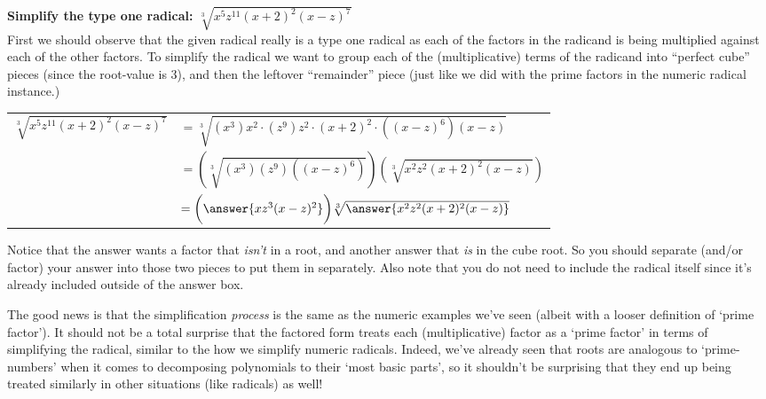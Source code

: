 \documentclass{ximera}
\begin{document}
    \begin{problem}
    {\bfseries Simplify the type one radical: $\sqrt[3]{x^5z^{11}(x+2)^2(x-z)^7}$}\\%
    
        First we should observe that the given radical really is a type one radical as each of the factors in the radicand is being multiplied against each of the other factors. To simplify the radical we want to group each of the (multiplicative) terms of the radicand into ``perfect cube'' pieces (since the root-value is $3$), and then the leftover ``remainder'' piece (just like we did with the prime factors in the numeric radical instance.)
        
        \begin{tabular}{rl}
            $\sqrt[3]{x^5z^{11}(x+2)^2(x-z)^7}$ &   $= \sqrt[3]{(x^3) x^2 \cdot (z^9) z^2 \cdot (x+2)^2 \cdot ((x-z)^6) (x-z)}$                 \\
                                                &   $= \left(\sqrt[3]{(x^3)(z^9)((x-z)^6)}\right) \left(\sqrt[3]{x^2 z^2 (x+2)^2 (x-z)}\right)$  \\
                                                &   $= \bigg(\answer{x z^3 (x-z)^2}\bigg) \sqrt[3]{\answer{x^2 z^2 (x+2)^2 (x-z)}}$                    \\
        \end{tabular}
        
        \begin{feedback}
            Notice that the answer wants a factor that \textit{isn't} in a root, and another answer that \textit{is} in the cube root. So you should separate (and/or factor) your answer into those two pieces to put them in separately.
            Also note that you do not need to include the radical itself since it's already included outside of the answer box.
        \end{feedback}
    \end{problem}%

    The good news is that the simplification \textit{process} is the same as the numeric examples we've seen (albeit with a looser definition of `prime factor'). It should not be a total surprise that the factored form treats each (multiplicative) factor as a `prime factor' in terms of simplifying the radical, similar to the how we simplify numeric radicals. Indeed, we've already seen that roots are analogous to `prime-numbers' when it comes to decomposing polynomials to their `most basic parts', so it shouldn't be surprising that they end up being treated similarly in other situations (like radicals) as well!
\end{document}
